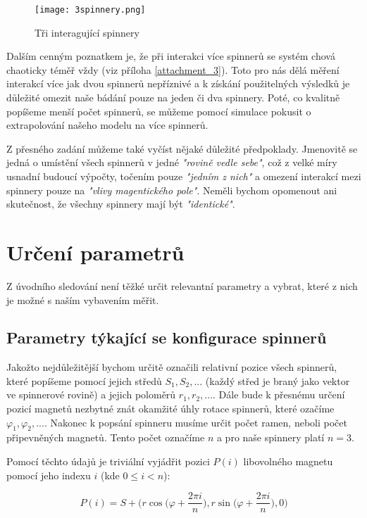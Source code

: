 \documentclass[12pt, a4paper,
 twoside,        %
 openright
]{report}
\begin{document}
\begin{wrapfigure}{l}{0.45\textwidth}
    \texttt{[image: 3spinnery.png]}
    \centering
    \caption{Tři interagující spinnery}
    \label{fig:3spinners}
\end{wrapfigure}
Dalším cenným poznatkem je, že při interakci více spinnerů se systém chová chaoticky téměř vždy (viz příloha \ref{attachment_3}).
Toto pro nás dělá měření interakcí více jak dvou spinnerů nepříznivé a k získání použitelných výsledků je důležité omezit naše bádání pouze na jeden či dva spinnery.
Poté, co kvalitně popíšeme menší počet spinnerů, se můžeme pomocí simulace pokusit o extrapolování našeho modelu na více spinnerů.

Z přesného zadání můžeme také vyčíst nějaké důležité předpoklady.
Jmenovitě se jedná o
umístění všech spinnerů v jedné \textit{"rovině vedle sebe"}, což z velké míry usnadní budoucí výpočty,
točením pouze \textit{"jedním z nich"} a
omezení interakcí mezi spinnery pouze na \textit{"vlivy magentického pole"}.
Neměli bychom opomenout ani skutečnost, že všechny spinnery mají být \textit{"identické"}.

\section{Určení parametrů}

Z úvodního sledování není těžké určit relevantní parametry a vybrat, které z nich je možné s naším vybavením měřit.

\subsection{Parametry týkající se konfigurace spinnerů}
Jakožto nejdůležitější bychom určitě označili relativní pozice všech spinnerů, které popíšeme pomocí jejich středů $S_1, S_2,...$ (každý střed je braný jako vektor ve spinnerové rovině) a jejich poloměrů $r_1, r_2, ...$.
Dále bude k přesnému určení pozicí magnetů nezbytné znát okamžité úhly rotace spinnerů, které ozačíme $\varphi_1, \varphi_2,...$.
Nakonec k popsání spinneru musíme určit počet ramen, neboli počet připevněných magnetů. Tento počet označíme $n$ a pro naše spinnery platí $n=3$.

Pomocí těchto údajů je triviální vyjádřit pozici $P(i)$ libovolného magnetu pomocí jeho indexu $i$ (kde $0 \leq i < n$):

\begin{equation}
    \label{eq:magnet_pos}
    P(i) = S + \biggr(r\cos{\bigg(\varphi + \frac{2\pi i}{n}\bigg)},
    r\sin{\bigg(\varphi+\frac{2\pi i}{n}}\bigg), 0 \bigg)
\end{equation}
\end{document}
